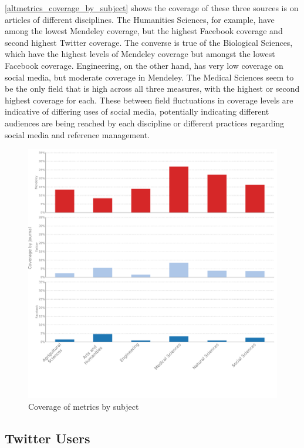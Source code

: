 \autoref{altmetrics_coverage_by_subject} shows the coverage of these three sources is on articles of different disciplines. The Humanities Sciences, for example, have among the lowest Mendeley coverage, but the highest Facebook coverage and second highest Twitter coverage. The converse is true of the Biological Sciences, which have the highest levels of Mendeley coverage but amongst the lowest Facebook coverage. Engineering, on the other hand, has very low coverage on social media, but moderate coverage in Mendeley. The Medical Sciences seem to be the only field that is high across all three measures, with the highest or second highest coverage for each. These between field fluctuations in coverage levels are indicative of differing uses of social media, potentially indicating different audiences are being reached by each discipline or different practices regarding social media and reference management.

\begin{figure}[htbp]
\centering
\includegraphics[keepaspectratio,width=\textwidth,height=0.45\textheight]{figures/altmetrics_coverage_by_subject.pdf}
\caption{Coverage of metrics by subject}
\label{altmetrics_coverage_by_subject}
\end{figure}

\subsection{Twitter Users}
\label{twitterusers}


